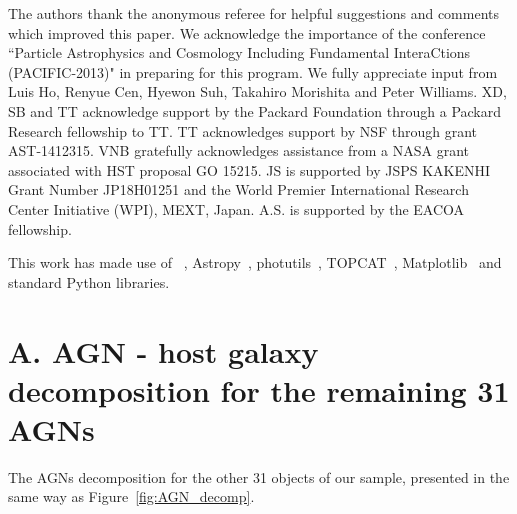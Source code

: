\documentclass[apj]{emulateapj}
\begin{document}
The authors thank the anonymous referee for helpful suggestions and comments which improved this paper. We acknowledge the importance of the conference ``Particle Astrophysics and Cosmology Including Fundamental InteraCtions (PACIFIC-2013)" in preparing for this program. We fully appreciate input from Luis Ho, Renyue Cen, Hyewon Suh, Takahiro Morishita and Peter Williams. XD, SB and TT acknowledge support by the Packard Foundation through a Packard Research fellowship to TT. TT acknowledges support by NSF through grant AST-1412315. VNB gratefully acknowledges assistance from a NASA grant associated with HST proposal GO 15215. JS is supported by JSPS KAKENHI Grant Number JP18H01251 and the World Premier International Research Center Initiative (WPI), MEXT, Japan. A.S. is supported by the EACOA fellowship.


This work has made use of \lenstronomy~\citep{lenstronomy}, {\sc Astropy}~\citep{Astropy}, {\sc photutils}~\citep{photutils}, {\sc TOPCAT}~\citep{TOPCAT}, {\sc Matplotlib}~\citep{Matplotlib} %
and standard Python libraries.



%

\newpage

\appendix

\section{A. AGN - host galaxy decomposition for the remaining 31 AGNs}\label{sec:restsample}
The AGNs decomposition for the other 31 objects of our sample, presented in the same way as Figure~\ref{fig:AGN_decomp}.
\end{document}
